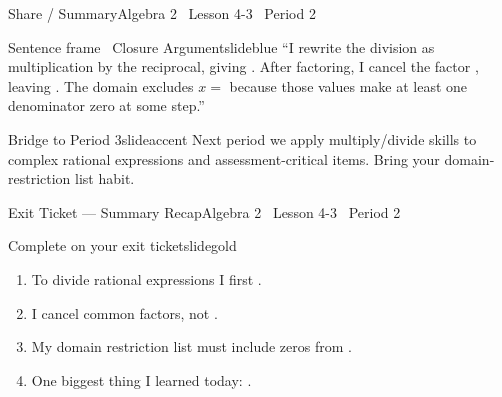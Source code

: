 \documentclass[aspectratio=169, 11pt]{beamer}
\begin{document}
\begin{frame}{Share / Summary}{Algebra 2 \textperiodcentered\ Lesson 4-3 \textperiodcentered\ Period 2}
\vspace{0.2cm}
\begin{projcard}{Sentence frame \textperiodcentered\ Closure Argument}{slideblue}
``I rewrite the division as multiplication by the reciprocal, giving \underline{\hspace{1cm}}. After factoring, I cancel the factor \underline{\hspace{1cm}}, leaving \underline{\hspace{1cm}}. The domain excludes \(x =\) \underline{\hspace{1cm}} because those values make at least one denominator zero at some step.''
\end{projcard}

\vspace{0.15cm}
\begin{projcard}{Bridge to Period 3}{slideaccent}
Next period we apply multiply/divide skills to complex rational expressions and assessment-critical items. Bring your domain-restriction list habit.
\end{projcard}
\end{frame}

\begin{frame}{Exit Ticket --- Summary Recap}{Algebra 2 \textperiodcentered\ Lesson 4-3 \textperiodcentered\ Period 2}
\vspace{0.2cm}
\begin{projcard}{Complete on your exit ticket}{slidegold}
\begin{enumerate}
  \setlength{\itemsep}{0.2cm}
  \item To divide rational expressions I first \underline{\hspace{5cm}}.
  \item I cancel common factors, not \underline{\hspace{5cm}}.
  \item My domain restriction list must include zeros from \underline{\hspace{5cm}}.
  \item One biggest thing I learned today: \underline{\hspace{4.5cm}}.
\end{enumerate}
\end{projcard}
\end{frame}
\end{document}
